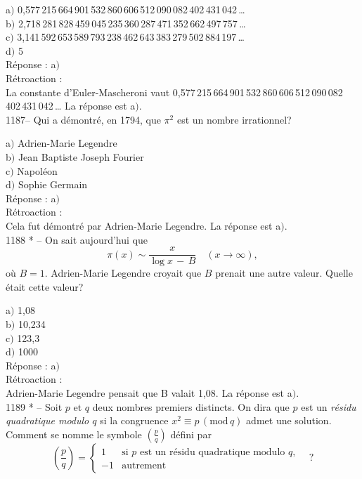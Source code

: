 ﻿\documentclass[letterpaper, 12pt]{article}
\begin{document}
a$)$
0,577\,215\,664\,901\,532\,860\,606\,512\,090\,082\,402\,431\,042\,\ldots \\
b$)$
2,718\,281\,828\,459\,045\,235\,360\,287\,471\,352\,662\,497\,757\,\ldots \\
c$)$
3,141\,592\,653\,589\,793\,238\,462\,643\,383\,279\,502\,884\,197\,\ldots \\
d$)$ 5\\

R\'eponse : a$)$\\

R\'etroaction : \\
La constante d'Euler-Mascheroni vaut
0,577\,215\,664\,901\,532\,860\,606\,512\,090\,082\,402\,431\,042\,\ldots
La r\'eponse est a$)$.\\

1187-- Qui a d\'emontr\'e, en 1794, que $\pi^2$ est un nombre
irrationnel?

a$)$ Adrien-Marie Legendre \\
b$)$ Jean Baptiste Joseph Fourier \\
c$)$ Napol\'eon \\
d$)$ Sophie Germain\\

R\'eponse : a$)$\\

R\'etroaction : \\
Cela fut d\'emontr\'e par Adrien-Marie Legendre.
La r\'eponse est a$)$.\\

1188 * -- On sait aujourd'hui que
$$\pi(x)\sim\displaystyle\frac x{\log x\,-\,B}\quad(x\to\infty),$$
o\`u $B=1$. Adrien-Marie Legendre croyait que $B$ prenait une autre
valeur. Quelle \'etait cette valeur?

a$)$ 1,08 \\
b$)$ 10,234 \\
c$)$ 123,3 \\
d$)$ 1000\\

R\'eponse : a$)$\\

R\'etroaction : \\
Adrien-Marie Legendre pensait que B valait 1,08.
La r\'eponse est a$)$.\\

1189 * -- Soit $p$ et $q$ deux nombres premiers distincts.
On dira que  $p$ est un {\sl r\'esidu quadratique modulo $q$} si la
congruence $x^2\equiv p\,(\mathrm{mod}\,q)$
admet une solution.
Comment se nomme le symbole $(\frac pq)$ d\'efini par
$$\displaystyle{\left(\frac pq\right)=\begin{cases}
1&\text{si $p$ est un r\'esidu quadratique modulo $q$,}\\[3mm]
-1&\text{autrement}
\end{cases}}\quad?$$
\end{document}

